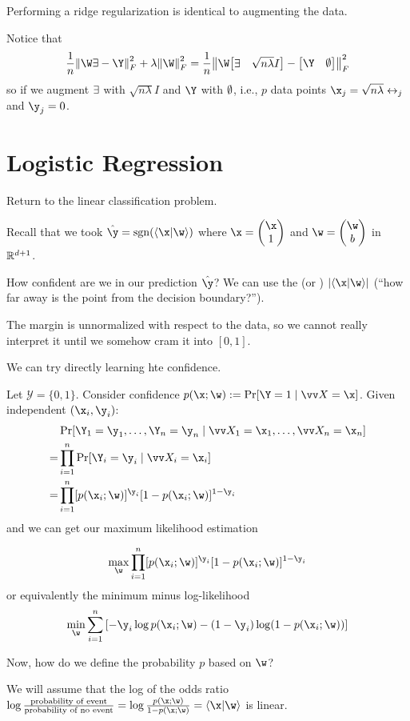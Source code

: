 \documentclass[class=cs480,notes,tikz]{agony}
\begin{document}
\begin{remark}
  Performing a ridge regularization is identical to augmenting the data.
\end{remark}

Notice that
\[
  \frac1n\norm{\W\X-\Y}^2_F + \lambda\norm{\W}^2_F
  = \frac1n\norm{\W\mqty[\X & \sqrt{n\lambda}I] - \mqty[\Y & \0]}^2_F
\]
so if we augment $\exists\!\,$ with $\sqrt{n\lambda}I$ and $\Y$ with $\emptyset$, i.e.,
$p$ data points $\x_j = \sqrt{n\lambda}\e_j$ and $\y_j = 0$.

\section{Logistic Regression}

Return to the linear classification problem.

Recall that we took $\hat{\y} = \sgn(\ip{\x}{\w})$
where $\x = \mqty(\x\\1)$ and $\w = \mqty(\w\\b)$ in $\mathbb{R}^{d+1}$.

How confident are we in our prediction $\hat\y$?
We can use the  (or ) $\abs{\ip{\x}{\w}}$
(``how far away is the point from the decision boundary?'').

The margin is unnormalized with respect to the data,
so we cannot really interpret it until we somehow cram it into $[0,1]$.

We can try directly learning hte confidence.

Let $\mathcal Y = \{0,1\}$.
Consider confidence $p(\x;\w) := \Pr[\Y = 1 \mid \vv X = \x]$.
Given independent $(\x_i,\y_i)$:
\begin{align*}
    & \Pr[\Y_1 = \y_1,\dotsc,\Y_n=\y_n \mid \vv X_1 = \x_1,\dotsc,\vv X_n = \x_n] \\
  = & \prod_{i=1}^n \Pr[\Y_i = \y_i \mid \vv X_i = \x_i]                          \\
  = & \prod_{i=1}^n [p(\x_i;\w)]^{\y_i}[1-p(\x_i;\w)]^{1-\y_i}
\end{align*}
and we can get our maximum likelihood estimation
\begin{defn}
  \[\max_{\w}\prod_{i=1}^n [p(\x_i;\w)]^{\y_i}[1-p(\x_i;\w)]^{1-\y_i} \]
  or equivalently the minimum minus log-likelihood
  \[ \min_{\w}\sum_{i=1}^n\qty[-\y_i\log p(\x_i;\w)-(1-\y_i)\log(1-p(\x_i;\w))] \]
\end{defn}
Now, how do we define the probability $p$ based on $\w$?

We will assume that the log of the odds ratio $\log\frac{\text{probability of event}}{\text{probability of no event}}
  = \log\frac{p(\x;\w)}{1-p(\x;\w)} = \ip{\x}{\w}$ is linear.
\end{document}
